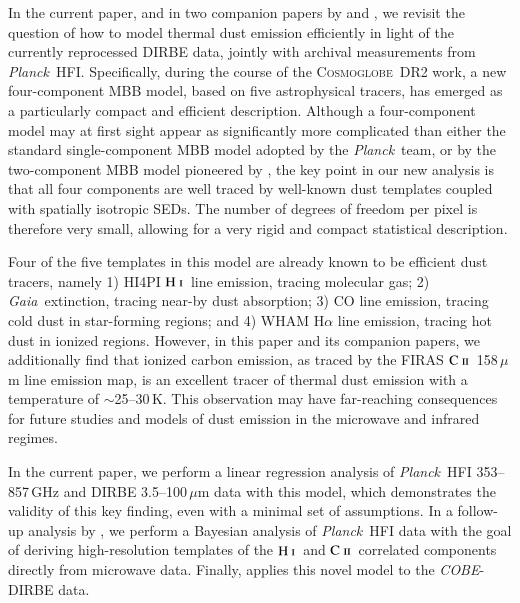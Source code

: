 \documentclass{aa}
\newcommand{\mathsc}[1]{{\normalfont\textsc{#1}}}
\def\Cosmoglobe{\textsc{Cosmoglobe}}
\def\Planck{\textit{Planck}}
\def\COBE{\textit{COBE}}
\def\GAIA{\textit{Gaia}}
\newcommand{\CII}{\ensuremath{\mathsc{C\ ii}}}
\newcommand{\HI}{\ensuremath{\mathsc{H\ i}}}
\begin{document}
In the current paper, and in two companion papers by \citet{CG02_06}
and \citet{CG02_07}, we revisit the question of how to model thermal
dust emission efficiently in light of the currently reprocessed DIRBE
data, jointly with archival measurements from
\Planck\ HFI. Specifically, during the course of the \Cosmoglobe\ DR2
work, a new four-component MBB model, based on five astrophysical tracers, has emerged as a particularly
compact and efficient description. Although a four-component model may
at first sight appear as significantly more complicated than either
the standard single-component MBB model adopted by the \Planck\ team,
or by the two-component MBB model pioneered by
\citet{finkbeiner:1999}, the key point in our new analysis is that all
four components are well traced by well-known dust templates coupled
with spatially isotropic SEDs. The number of degrees of freedom per
pixel is therefore very small, allowing for a very rigid and compact
statistical description.

Four of the five templates in this model are already known to be
efficient dust tracers, namely 1) HI4PI \HI\ line emission, tracing
molecular gas; 2) \GAIA\ extinction, tracing near-by dust absorption;
3) \citet{dame:2001} CO line emission, tracing cold dust in
star-forming regions; and 4) WHAM H$\alpha$ line emission, tracing hot
dust in ionized regions. However, in this paper and its companion
papers, we additionally find that ionized carbon emission, as traced
by the FIRAS \CII\ 158\,$\mu$m line emission map, is an excellent
tracer of thermal dust emission with a temperature of
$\sim$25--30\,K. This observation may have far-reaching consequences
for future studies and models of dust emission in the microwave and
infrared regimes.

In the current paper, we perform a linear regression analysis of
\Planck\ HFI 353--857\,GHz and DIRBE 3.5--100\,$\mu$m data with this
model, which demonstrates the validity of this key finding, even with a
minimal set of assumptions. In a follow-up analysis by \citet{CG02_06},
we perform a Bayesian analysis of \Planck\ HFI data with the goal of
deriving high-resolution templates of the \HI\ and \CII\ correlated
components directly from microwave data. Finally, \citet{CG02_07}
applies this novel model to the \COBE-DIRBE data.
\end{document}
